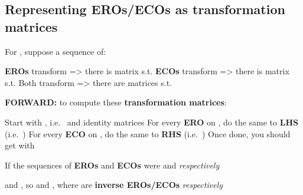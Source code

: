 \subsection*{Representing EROs/ECOs as transformation matrices}


For , suppose a sequence of:

\begin{itemize}

      \vItem
            \textbf{EROs} transform
             =>
            there is matrix  s.t. 
      \vItem
            \textbf{ECOs} transform
             =>
            there is matrix  s.t. 
      \vItem
            Both transform
            => there are matrices  s.t. 
\end{itemize}

\hSep %

\textbf{FORWARD:} to compute these \textbf{transformation matrices}:

\begin{itemize}

      \vItem
            Start with \iMbox{[I_{m} \ | \ A \ | \ I_{n}]}, i.e.~ and
            identity matrices
      \vItem
            For every \textbf{ERO} on , do the same to \textbf{LHS}
            (i.e.~)
      \vItem
            For every \textbf{ECO} on , do the same to \textbf{RHS}
            (i.e.~)
      \vItem
            Once done, you should get
            \iMbox{\ds [I_{m} \ | \ A \ | \ I_{n}] \rightsquigarrow [R \ | \ A' \ | \ C]}
            with 
\end{itemize}

\hSep %

If the sequences of \textbf{EROs} and \textbf{ECOs} were
 and
 \emph{respectively}

\begin{itemize}

      \vItem
             and
            , so
      \vItem
             and
            , where
             are \textbf{inverse EROs/ECOs}
            \emph{respectively}
\end{itemize}


